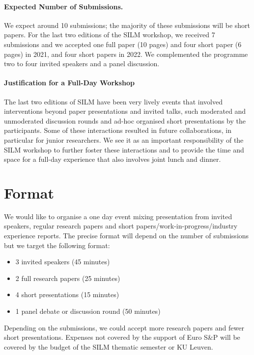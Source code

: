 \documentclass[a4paper,11pt]{article}
\begin{document}
\paragraph{Expected Number of Submissions.}
%
We expect around 10 submissions; the majority of these submissions will be
short papers.
%
For the last two editions of the SILM workshop, we received 7 submissions
and we accepted one full paper (10 pages) and four short paper (6 pages) in
2021, and four short papers in 2022. We complemented the programme two to
four invited speakers and a panel discussion.

\paragraph{Justification for a Full-Day Workshop}
%
The last two editions of SILM have been very lively events that involved
interventions beyond paper presentations and invited talks, such moderated
and unmoderated discussion rounds and ad-hoc organised short presentations
by the participants. Some of these interactions resulted in future
collaborations, in particular for junior researchers. We see it as an
important responsibility of the SILM workshop to further foster these
interactions and to provide the time and space for a full-day experience
that also involves joint lunch and dinner.


\section{Format}
%
We would like to organise a one day event mixing presentation from invited
speakers, regular research papers and short
papers/work-in-progress/industry experience reports. The precise format
will depend on the number of submissions but we target the following
format:
%
\begin{itemize}
    \item 3 invited speakers (45 minutes)
    \item 2 full research papers (25 minutes)
    \item 4 short presentations (15 minutes)
    \item 1 panel debate or discussion round (50 minutes)
\end{itemize}

Depending on the submissions, we could accept more research papers and
fewer short presentations. Expenses not covered by the support of Euro S\&P
will be covered by the budget of the SILM thematic semester or KU Leuven.
\end{document}
